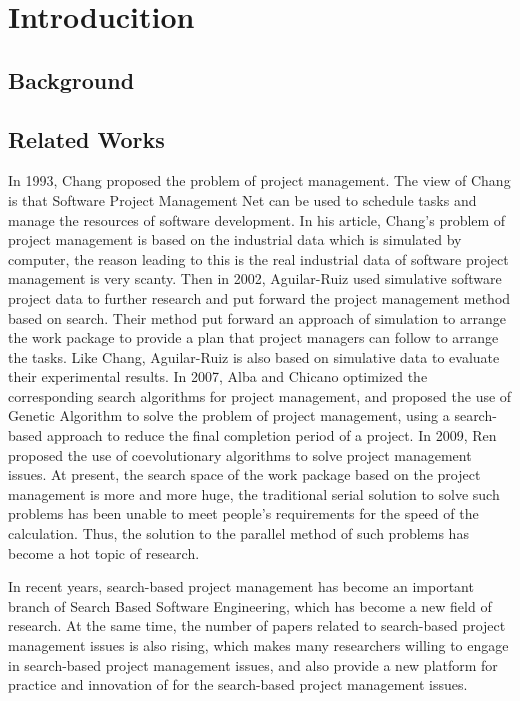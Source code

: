 
\section{Introducition}

\subsection{Background}


\subsection{Related Works}
%
In 1993, Chang proposed the problem of project management. The view
of Chang is that Software Project Management Net can be used to
schedule tasks and manage the resources of software development. In
his article, Chang's problem of project management is based on the
industrial data which is simulated by computer, the reason leading to
this is the real industrial data of software project management is
very scanty. Then in 2002, Aguilar-Ruiz used simulative software
project data to further research and put forward the project
management method based on search. Their method put forward an
approach of simulation to arrange the work package to provide a plan
that project managers can follow to arrange the tasks\cite{alba}. Like
Chang, Aguilar-Ruiz is also based on simulative data to evaluate their
experimental results. In 2007, Alba and Chicano optimized the
corresponding search algorithms for project management, and proposed
the use of Genetic Algorithm to solve the problem of project
management, using a search-based approach to reduce the final
completion period of a project. In 2009, Ren proposed the use of
coevolutionary algorithms to solve project management
issues\cite{ren}. At present, the search space of the work package
based on the project management is more and more huge, the traditional
serial solution to solve such problems has been unable to meet
people's requirements for the speed of the calculation.  Thus, the
solution to the parallel method of such problems has become a hot
topic of research\cite{pentico}.

In recent years, search-based project management has become an
important branch of Search Based Software Engineering, which has
become a new field of research. At the same time, the number of papers
related to search-based project management issues is also rising,
which makes many researchers willing to engage in search-based project
management issues, and also provide a new platform for practice and
innovation of for the search-based project management
issues\cite{penta}.

